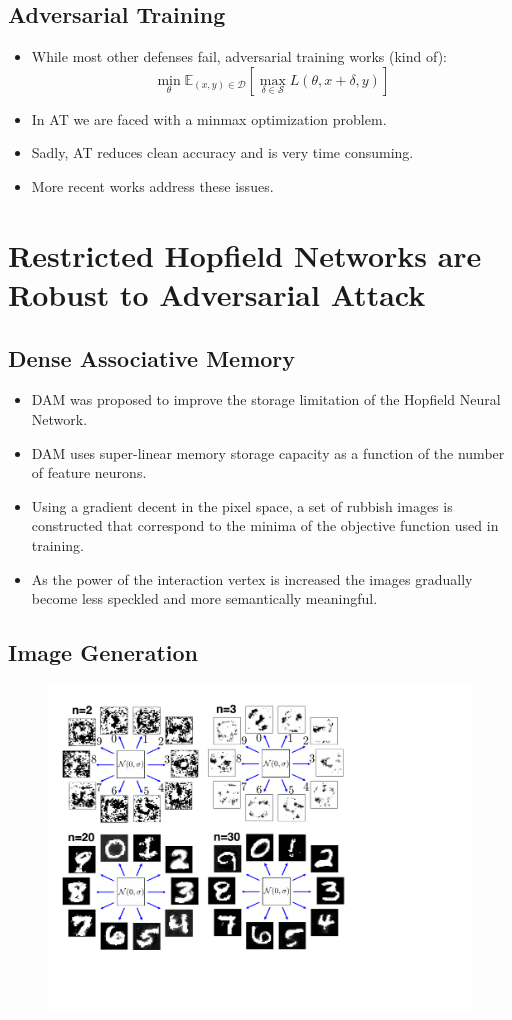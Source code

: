 \documentclass{antclass}
\begin{document}
\section{Adversarial Training}
\begin{itemize}
	\item While most other defenses fail, adversarial training works (kind of):
	$$
	\min_\theta \mathbb{E}_{(x,y)\in \mathcal{D}}\left[\max_{\delta \in \mathcal{S}} L(\theta, x+\delta, y)\right]
	$$
		\item In AT we are faced with a minmax optimization problem.
		\item Sadly, AT reduces clean accuracy and is very time consuming.
		\item More recent works address these issues.
\end{itemize}

\chapter{ Restricted Hopfield Networks are Robust to Adversarial Attack}
\section{Dense Associative Memory}
\begin{itemize}
	\item DAM was proposed to improve the storage limitation of the Hopfield Neural Network.
	\item DAM uses super-linear memory storage capacity as a function of the number of feature neurons.
	\item Using a gradient decent in the pixel space, a set of rubbish images is constructed that correspond to the minima of the objective function used in training.
	\item As the power of the interaction vertex is increased the images gradually become less speckled and more semantically meaningful.
\end{itemize}
\section{Image Generation}

\begin{figure}
	\centering
	\includegraphics[width=0.55\linewidth]{pics/Rubbish_n_2_3_20_30}
\end{figure}
\end{document}
